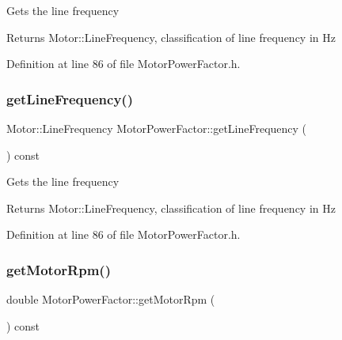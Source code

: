 Gets the line frequency \begin{DoxyReturn}{Returns}
Motor\+::\+Line\+Frequency, classification of line frequency in Hz 
\end{DoxyReturn}


Definition at line 86 of file Motor\+Power\+Factor.\+h.

\mbox{\label{class_motor_power_factor_aa4cdc420b1f611bcb9f4a69c69c1fabf}} 
\subsubsection{\texorpdfstring{get\+Line\+Frequency()}{getLineFrequency()}\hspace{0.1cm}{\footnotesize\ttfamily [3/3]}}
{\footnotesize\ttfamily Motor\+::\+Line\+Frequency Motor\+Power\+Factor\+::get\+Line\+Frequency (\begin{DoxyParamCaption}{ }\end{DoxyParamCaption}) const\hspace{0.3cm}{\ttfamily [inline]}}

Gets the line frequency \begin{DoxyReturn}{Returns}
Motor\+::\+Line\+Frequency, classification of line frequency in Hz 
\end{DoxyReturn}


Definition at line 86 of file Motor\+Power\+Factor.\+h.

\mbox{\label{class_motor_power_factor_acc7e144fc6c05446141cb0e07be03d70}} 
\subsubsection{\texorpdfstring{get\+Motor\+Rpm()}{getMotorRpm()}\hspace{0.1cm}{\footnotesize\ttfamily [1/3]}}
{\footnotesize\ttfamily double Motor\+Power\+Factor\+::get\+Motor\+Rpm (\begin{DoxyParamCaption}{ }\end{DoxyParamCaption}) const\hspace{0.3cm}{\ttfamily [inline]}}

